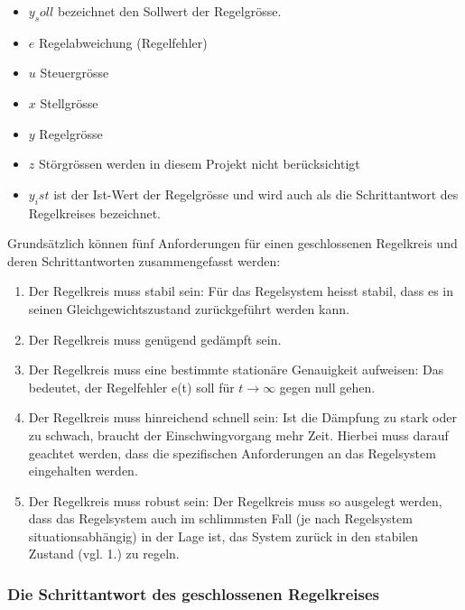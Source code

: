 \begin{itemize}
    \item
        $y_soll$ bezeichnet den Sollwert der Regelgr\"osse.
    \item
        $e$ Regelabweichung (Regelfehler)
    \item
        $u$ Steuergr\"osse
    \item
        $x$ Stellgr\"osse
    \item
        $y$ Regelgr\"osse
    \item
        $z$ St\"orgr\"ossen werden in diesem Projekt nicht ber\"ucksichtigt
    \item
        $y_ist$  ist der  Ist-Wert der  Regelgr\"osse  und wird  auch als  die
        Schrittantwort des Regelkreises bezeichnet.
\end{itemize}


Grunds\"atzlich k\"onnen f\"unf Anforderungen f\"ur einen geschlossenen
Regelkreis und deren Schrittantworten zusammengefasst werden:
\begin{enumerate}
    \item
        Der Regelkreis muss stabil sein:  F\"ur das Regelsystem heisst stabil,
        dass es in seinen Gleichgewichtszustand zur\"uckgef\"uhrt werden kann.
    \item
        Der Regelkreis muss gen\"ugend ged\"ampft sein.
    \item
        Der   Regelkreis   muss   eine  bestimmte   station\"are   Genauigkeit
        aufweisen: Das   bedeutet,    der   Regelfehler   e(t)    soll   f\"ur
        $t\rightarrow\infty$ gegen null gehen.
    \item
        Der  Regelkreis muss  hinreichend  schnell sein:   Ist die  D\"ampfung
        zu  stark   oder  zu  schwach,  braucht   der  Einschwingvorgang  mehr
        Zeit. Hierbei  muss  darauf  geachtet werden,  dass  die  spezifischen
        Anforderungen an das Regelsystem eingehalten werden.
    \item
        Der  Regelkreis muss  robust  sein: Der Regelkreis  muss so  ausgelegt
        werden,  dass  das  Regelsystem  auch im  schlimmsten  Fall  (je  nach
        Regelsystem situationsabh\"angig) in der Lage ist, das System zur\"uck
        in den stabilen Zustand (vgl. 1.) zu regeln.
\end{enumerate}

\subsubsection{Die Schrittantwort des geschlossenen Regelkreises}

